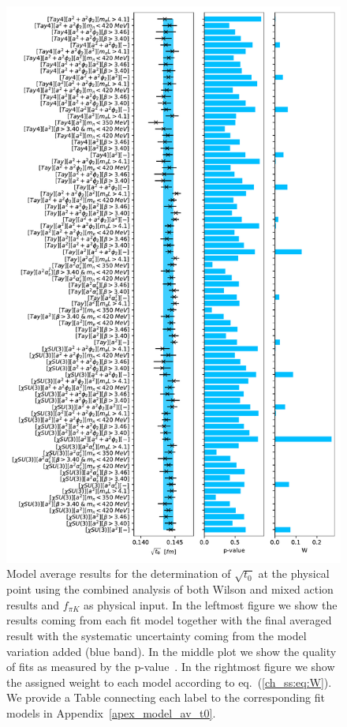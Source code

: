 \begin{figure}
    \centering
    \includegraphics[width=1.\textwidth]{./cap5/figs/BMA_comb.pdf}
    \caption{Model average results for the determination of $\sqrt{t_0}$ at the physical point using the combined analysis of both Wilson and mixed action results and $f_{\pi K}$ as physical input. In the leftmost figure we show the results coming from each fit model together with the final averaged result with the systematic uncertainty coming from the model variation added (blue band). In the middle plot we show the quality of fits as measured by the p-value~\citep{Bruno:2022mfy}. In the rightmost figure we show the assigned weight to each model according to eq.~(\ref{ch_ss:eq:W}). We provide a Table connecting each label to the corresponding fit models in Appendix~\ref{apex_model_av_t0}.}
    \label{ch_ss:fig:BMA_comb}
\end{figure}

